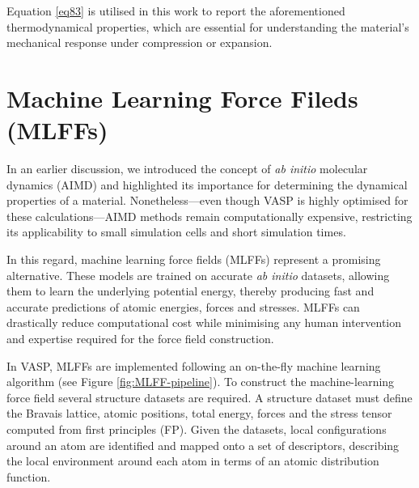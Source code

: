 Equation \ref{eq83} is utilised in this work to report the aforementioned thermodynamical
properties, which are essential for understanding the material's mechanical 
response under compression or expansion. 

\section{Machine Learning Force Fileds (MLFFs)}
In an earlier discussion, we introduced the concept of \emph{ab initio} molecular 
dynamics (AIMD) and highlighted its importance for determining the 
dynamical properties of a material. Nonetheless---even though VASP is highly optimised for 
these calculations---AIMD methods remain computationally expensive, 
restricting its applicability to small simulation cells and 
short simulation times. 


In this regard, machine learning force fields (MLFFs) represent a 
promising alternative. These models are trained on accurate \emph{ab initio}
datasets, allowing them to learn the underlying potential energy, 
thereby producing fast and accurate predictions of atomic energies, forces and stresses. 
MLFFs can drastically reduce computational cost while minimising any human 
intervention and expertise required for the force field construction.

In VASP, MLFFs are implemented following an on-the-fly machine learning algorithm\supercite{Jinnouchi2019} (see 
Figure \ref{fig:MLFF-pipeline}). To construct the machine-learning force field
several structure datasets are required. A structure dataset must define the Bravais lattice, atomic positions, total 
energy, forces and the stress tensor computed from first principles (FP). 
Given the datasets, local configurations around an atom are identified 
and mapped onto a set of descriptors\supercite{Jinnouchi2020}, describing the local environment
around each atom in terms of an atomic distribution function.

